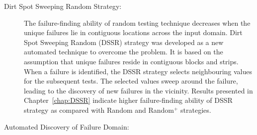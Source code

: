 \begin{description}
\item[Dirt Spot Sweeping Random Strategy:]

The failure-finding ability of random testing technique decreases when the unique failures lie in contiguous locations across the input domain. Dirt Spot Sweeping Random (DSSR) strategy was developed as a new automated technique to overcome the problem. It is based on the assumption that unique failures reside in contiguous blocks and strips. When a failure is identified, the DSSR strategy selects neighbouring values for the subsequent tests. The selected values sweep around the failure, leading to the discovery of new failures in the vicinity. Results presented in Chapter~\ref{chap:DSSR} indicate higher failure-finding ability of DSSR strategy as compared with Random and Random$^+$ strategies.\\

\item[Automated Discovery of Failure Domain:]


\end{description}
